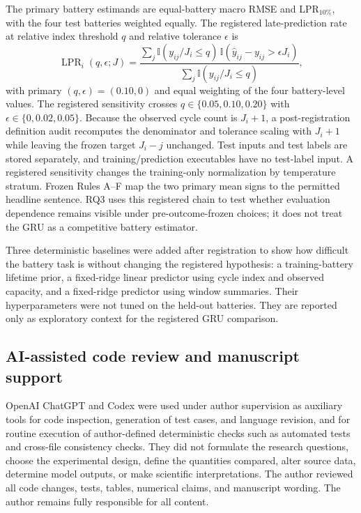\documentclass[preprint,12pt,numbers,sort&compress]{elsarticle}
\begin{document}
The primary battery estimands are equal-battery macro RMSE and LPR$_{10\%}$, with the four test batteries weighted equally. The registered late-prediction rate at relative index threshold $q$ and relative tolerance $\epsilon$ is
\begin{equation}
\operatorname{LPR}_i(q,\epsilon;J)=\frac{\sum_j \mathbb I(y_{ij}/J_i\le q)\,\mathbb I(\hat y_{ij}-y_{ij}>\epsilon J_i)}{\sum_j \mathbb I(y_{ij}/J_i\le q)},
\end{equation}
with primary $(q,\epsilon)=(0.10,0)$ and equal weighting of the four battery-level values. The registered sensitivity crosses $q\in\{0.05,0.10,0.20\}$ with $\epsilon\in\{0,0.02,0.05\}$. Because the observed cycle count is $J_i+1$, a post-registration definition audit recomputes the denominator and tolerance scaling with $J_i+1$ while leaving the frozen target $J_i-j$ unchanged. Test inputs and test labels are stored separately, and training/prediction executables have no test-label input. A registered sensitivity changes the training-only normalization by temperature stratum. Frozen Rules A--F map the two primary mean signs to the permitted headline sentence. RQ3 uses this registered chain to test whether evaluation dependence remains visible under pre-outcome-frozen choices; it does not treat the GRU as a competitive battery estimator.

Three deterministic baselines were added after registration to show how difficult the battery task is without changing the registered hypothesis: a training-battery lifetime prior, a fixed-ridge linear predictor using cycle index and observed capacity, and a fixed-ridge predictor using window summaries. Their hyperparameters were not tuned on the held-out batteries. They are reported only as exploratory context for the registered GRU comparison.

\subsection{AI-assisted code review and manuscript support}

OpenAI ChatGPT and Codex were used under author supervision as auxiliary tools for code inspection, generation of test cases, and language revision, and for routine execution of author-defined deterministic checks such as automated tests and cross-file consistency checks. They did not formulate the research questions, choose the experimental design, define the quantities compared, alter source data, determine model outputs, or make scientific interpretations. The author reviewed all code changes, tests, tables, numerical claims, and manuscript wording. The author remains fully responsible for all content.
\end{document}
